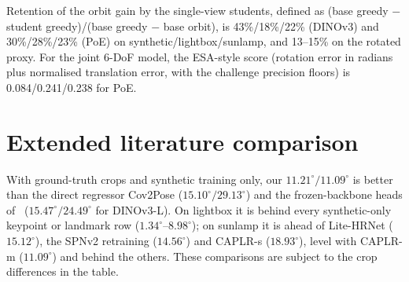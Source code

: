 \begin{table}[h]
  \centering\small
  \setlength{\tabcolsep}{2.5pt}
  \resizebox{\linewidth}{!}{}
  \caption{\textbf{Training-time consistency.} Single-view DINOv3 trees on synthetic and rotated synthetic validation (left) and PoE + orbit (right). The consistency losses transport each view's beam distribution into another view's frame via \cref{eq:roll}.}
  \label{tab:consistency}
\end{table}

Retention of the orbit gain by the single-view students, defined as (base greedy $-$ student greedy)/(base greedy $-$ base orbit), is 43\%/18\%/22\% (DINOv3) and 30\%/28\%/23\% (PoE) on synthetic/lightbox/sunlamp, and 13--15\% on the rotated proxy.
For the joint 6-DoF model, the ESA-style score (rotation error in radians plus normalised translation error, with the challenge precision floors) is 0.084/0.241/0.238 for PoE.

\section{Extended literature comparison}
\label{sec:supp_lit}
\begin{table}[t]
  \centering\footnotesize
  \setlength{\tabcolsep}{3.5pt}
  \resizebox{\linewidth}{!}{}
  \caption{\textbf{SPEED+ real domains, further published results} (lightbox LB, sunlamp SL), complementing \cref{tab:spp_sota}, as reported by each source. Blank (--) means not reported, or for crops that we could not verify it from the source. $^*$\,uses real or unlabelled test-domain images in training. $^\P$\,evaluated on reduced test splits. $^\S$\,inference settings chosen on the real test sets by the source. The SPNv2 rows are the retraining in~\cite{legrand2026cadfree}, which differs from the published SPNv2 numbers in \cref{tab:spp_sota}. Ours: distilled PoE students, orbit voting (pre-registered rule), DINOv3 translation block, 3 seeds. Settings differ, so only rows with the same training data and crop are matched.}
  \label{tab:spp_lit}
\end{table}
With ground-truth crops and synthetic training only, our $11.21^\circ/11.09^\circ$ is better than the direct regressor Cov2Pose ($15.10^\circ/29.13^\circ$) and the frozen-backbone heads of~\cite{church2026vfm} ($15.47^\circ/24.49^\circ$ for DINOv3-L). On lightbox it is behind every synthetic-only keypoint or landmark row ($1.34^\circ$--$8.98^\circ$); on sunlamp it is ahead of Lite-HRNet ($15.12^\circ$), the SPNv2 retraining ($14.56^\circ$) and CAPLR-s ($18.93^\circ$), level with CAPLR-m ($11.09^\circ$) and behind the others. These comparisons are subject to the crop differences in the table.


